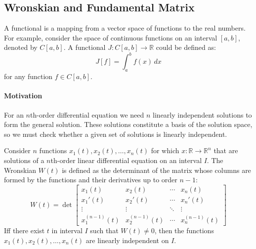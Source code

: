 \documentclass[11pt]{article}
\begin{document}
\subsection{Wronskian and Fundamental Matrix}
\begin{definition}[Functionals]
    A functional is a mapping from a vector space of functions to the real numbers. For example, consider the space of continuous functions on an interval \( [a, b] \), denoted by \( C[a, b] \). A functional \( J: C[a, b] \to \mathbb{R} \) could be defined as:
    $$
    J[f] = \int_a^b f(x) \, dx
    $$
    for any function \( f \in C[a, b] \).
\end{definition}

\paragraph{Motivation} For an $n$th-order differential equation we need $n$ linearly independent solutions to form the general solution. These solutions constitute a basis of the solution space, so we must check whether a given set of solutions is linearly independent.

\begin{definition}[Wronskian]
    Consider \( n \) functions \( x_1(t), x_2(t), \ldots, x_n(t) \) for which \( x: \mathbb{R} \to \mathbb{R}^n \) that are solutions of a $n$th-order linear differential equation on an interval \( I \). The Wronskian \( W(t) \) is defined as the determinant of the matrix whose columns are formed by the functions and their derivatives up to order \( n-1 \):
    \begin{equation}
    W(t) = \det\begin{bmatrix}
    x_1(t) & x_2(t) & \cdots & x_n(t) \\
    x_1'(t) & x_2'(t) & \cdots & x_n'(t) \\
    \vdots & \vdots & \ddots & \vdots \\
    x_1^{(n-1)}(t) & x_2^{(n-1)}(t) & \cdots & x_n^{(n-1)}(t)
    \end{bmatrix} 
    \end{equation}
    Iff there exist \( t \) in interval \( I \) such that \( W(t) \neq 0 \), then the functions \( x_1(t), x_2(t), \ldots, x_n(t) \) are linearly independent on \( I \).

\end{definition}
\end{document}
